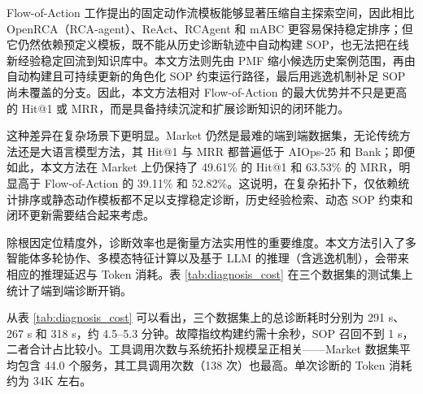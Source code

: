 Flow-of-Action 工作提出的固定动作流模板能够显著压缩自主探索空间，因此相比 OpenRCA（RCA-agent）、ReAct、RCAgent 和 mABC 更容易保持稳定排序；但它仍然依赖预定义模板，既不能从历史诊断轨迹中自动构建 SOP，也无法把在线新经验稳定回流到知识库中。本文方法则先由 PMF 缩小候选历史案例范围，再由自动构建且可持续更新的角色化 SOP 约束运行路径，最后用逃逸机制补足 SOP 尚未覆盖的分支。因此，本文方法相对 Flow-of-Action 的最大优势并不只是更高的 Hit@1 或 MRR，而是具备持续沉淀和扩展诊断知识的闭环能力。

这种差异在复杂场景下更明显。Market 仍然是最难的端到端数据集，无论传统方法还是大语言模型方法，其 Hit@1 与 MRR 都普遍低于 AIOps-25 和 Bank；即便如此，本文方法在 Market 上仍保持了 49.61\% 的 Hit@1 和 63.53\% 的 MRR，明显高于 Flow-of-Action 的 39.11\% 和 52.82\%。这说明，在复杂拓扑下，仅依赖统计排序或静态动作模板都不足以支撑稳定诊断，历史经验检索、动态 SOP 约束和闭环更新需要结合起来考虑。

除根因定位精度外，诊断效率也是衡量方法实用性的重要维度。本文方法引入了多智能体多轮协作、多模态特征计算以及基于 LLM 的推理（含逃逸机制），会带来相应的推理延迟与 Token 消耗。表 \ref{tab:diagnosis_cost} 在三个数据集的测试集上统计了端到端诊断开销。

\begin{table}[htbp]
    \centering
    \label{tab:diagnosis_cost}
    \ChapFiveTableSetup
\end{table}

从表 \ref{tab:diagnosis_cost} 可以看出，三个数据集上的总诊断耗时分别为 291 s、267 s 和 318 s，约 4.5--5.3 分钟。故障指纹构建约需十余秒，SOP 召回不到 1 s，二者合计占比较小。工具调用次数与系统拓扑规模呈正相关——Market 数据集平均包含 44.0 个服务，其工具调用次数（138 次）也最高。单次诊断的 Token 消耗约为 34K 左右。

